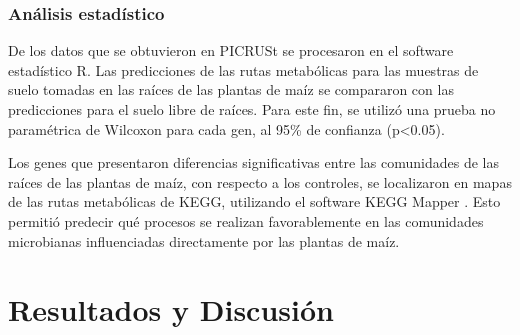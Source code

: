 \documentclass[12pt,letterpaper,oneside]{report}
\begin{document}
\subsection{Análisis estadístico}
De los datos que se obtuvieron en PICRUSt se procesaron en el software estadístico R. Las predicciones de las rutas metabólicas para las muestras de suelo tomadas en las raíces de las plantas de maíz se compararon con las predicciones para el suelo libre de raíces. Para este fin, se utilizó una prueba no paramétrica de Wilcoxon para cada gen, al 95\% de confianza (p\textless 0.05).
\par 
Los genes que presentaron diferencias significativas entre las comunidades de las raíces de las plantas de maíz, con respecto a los controles, se localizaron en mapas de las rutas metabólicas de KEGG, utilizando el software KEGG Mapper \autocite{Kanehisa2019}. Esto permitió predecir qué procesos se realizan favorablemente en las comunidades microbianas influenciadas directamente por las plantas de maíz.
 
\chapter{Resultados y Discusión}
\end{document}
